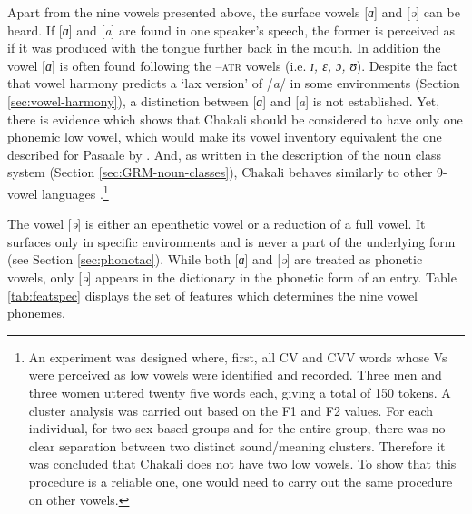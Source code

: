 Apart from the nine vowels presented above, the surface vowels  [\textit{ɑ}] and 
[\textit{ə}] can be heard.  If [\textit{ɑ}] 
and [\textit{a}] are found in one speaker's speech, the former is perceived as 
if it was produced with the tongue further back in the mouth. In addition the 
vowel [\textit{ɑ}]  is often found  following the \textsc{--atr} vowels (i.e. 
{\it ɪ, ɛ, ɔ, ʊ}). Despite the fact that vowel harmony predicts a `lax version'  
of /\textit{a}/ in some environments (Section \ref{sec:vowel-harmony}),  a 
distinction between [\textit{ɑ}] and  [\textit{a}] is not established. Yet, 
there is  evidence which shows that Chakali should be considered to have only 
one phonemic low vowel, which would make its vowel inventory equivalent the one 
described for  Pasaale by \citet{Toup95}.  And, as  written in the 
description of the  noun class system (Section \ref{sec:GRM-noun-classes}),  
Chakali behaves similarly to other 9-vowel  languages 
\citep[see][41]{Casa03a}.\footnote{An experiment  was designed where, first, all 
CV and CVV words whose  Vs were perceived as low vowels were identified and 
recorded.  Three men and three women uttered twenty five words each, giving a 
total of 150 tokens. A cluster analysis was carried out based on the F1 and F2 
values. For each individual, for two sex-based groups and for the entire group, 
there was no clear separation between two distinct sound/meaning clusters. 
Therefore it was concluded that Chakali does not have two low vowels. To show 
that this procedure is a reliable one, one would need to carry out the same 
procedure on other vowels.} 

The vowel [\textit{ə}] is either an epenthetic vowel or a reduction of a full 
vowel. It surfaces only in specific environments and is never a part of the 
underlying form (see  Section \ref{sec:phonotac}). While both   
[\textit{ɑ}] and   [\textit{ə}] are treated as phonetic vowels, only  
[\textit{ə}]  appears in the dictionary in the phonetic form of an entry. Table 
\ref{tab:featspec} displays the set of features which determines the nine vowel 
phonemes. 


